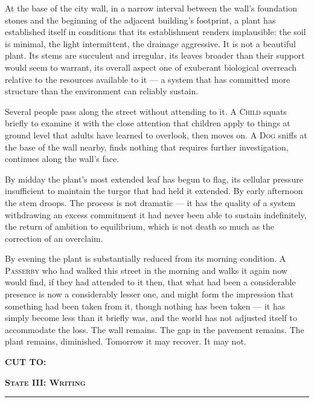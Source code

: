 \documentclass[12pt, oneside]{article}
\newenvironment{action}{%
  \vspace{0.6em}%
  \noindent\ignorespaces%
}{%
  \par\vspace{0.6em}%
}
\newcommand{\statebreak}[2]{%
  \vspace{2.5em}%
  \begin{center}%
    {\large\bfseries\scshape State #1: #2}%
  \end{center}%
  \vspace{0.3em}%
  \begin{center}%
    {\color{rulecolor}\rule{0.6\linewidth}{0.5pt}}%
  \end{center}%
  \vspace{1.5em}%
}
\newcommand{\transition}[1]{%
  \vspace{0.8em}%
  \begin{flushright}%
    \bfseries #1%
  \end{flushright}%
  \vspace{0.5em}%
}
\begin{document}
\begin{action}
At the base of the city wall, in a narrow interval between the wall's foundation stones and the beginning of the adjacent building's footprint, a plant has established itself in conditions that its establishment renders implausible: the soil is minimal, the light intermittent, the drainage aggressive. It is not a beautiful plant. Its stems are succulent and irregular, its leaves broader than their support would seem to warrant, its overall aspect one of exuberant biological overreach relative to the resources available to it --- a system that has committed more structure than the environment can reliably sustain.

Several people pass along the street without attending to it. A \textsc{Child} squats briefly to examine it with the close attention that children apply to things at ground level that adults have learned to overlook, then moves on. A \textsc{Dog} sniffs at the base of the wall nearby, finds nothing that requires further investigation, continues along the wall's face.

By midday the plant's most extended leaf has begun to flag, its cellular pressure insufficient to maintain the turgor that had held it extended. By early afternoon the stem droops. The process is not dramatic --- it has the quality of a system withdrawing an excess commitment it had never been able to sustain indefinitely, the return of ambition to equilibrium, which is not death so much as the correction of an overclaim.

By evening the plant is substantially reduced from its morning condition. A \textsc{Passerby} who had walked this street in the morning and walks it again now would find, if they had attended to it then, that what had been a considerable presence is now a considerably lesser one, and might form the impression that something had been taken from it, though nothing has been taken --- it has simply become less than it briefly was, and the world has not adjusted itself to accommodate the loss. The wall remains. The gap in the pavement remains. The plant remains, diminished. Tomorrow it may recover. It may not.
\end{action}

\transition{CUT TO:}

\statebreak{III}{Writing}

\end{document}
